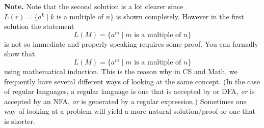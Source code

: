 {\bf Note.}
Note that the second solution is a lot clearer since
$L(r) = \{a^k \mid k \text{ is a multiple of $n$} \}$ is
shown completely.
However in the first solution the statement
\[
L(M) = \{a^m \mid m \text{ is a multiple of $n$} \}
\]
is not so immediate and properly speaking requires some proof.
You can formally show that 
\[
L(M) = \{a^m \mid m \text{ is a multiple of $n$} \}
\]
using mathematical induction.
This is the reason why in CS and Math, we frequently have several different
ways of looking at the same concept.
(In the case of regular languages, a regular language is one that
is accepted by or DFA, {\it or} is accepted by an NFA, {\it or}
is generated by a regular expression.)
Sometimes one way of looking at a problem will yield a more natural 
solution/proof or one that is shorter.
